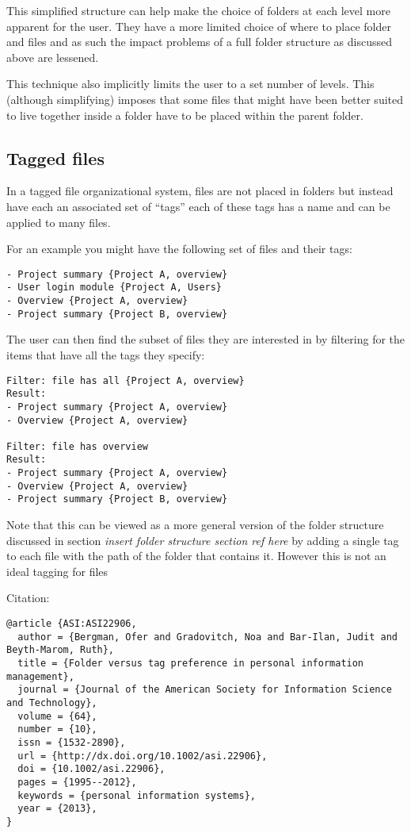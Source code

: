 This simplified structure can help make the choice of folders at each
level more apparent for the user. They have a more limited choice of
where to place folder and files and as such the impact problems of a
full folder structure as discussed above are lessened.

This technique also implicitly limits the user to a set number of
levels. This (although simplifying) imposes that some files that might
have been better suited to live together inside a folder have to be
placed within the parent folder.

\subsection{Tagged files}\label{tagged-files}

In a tagged file organizational system, files are not placed in folders
but instead have each an associated set of ``tags'' each of these tags
has a name and can be applied to many files.

For an example you might have the following set of files and their tags:

\begin{verbatim}
- Project summary {Project A, overview}
- User login module {Project A, Users}
- Overview {Project A, overview}
- Project summary {Project B, overview}
\end{verbatim}

The user can then find the subset of files they are interested in by
filtering for the items that have all the tags they specify:

\begin{verbatim}
Filter: file has all {Project A, overview}
Result:
- Project summary {Project A, overview}
- Overview {Project A, overview}

Filter: file has overview
Result:
- Project summary {Project A, overview}
- Overview {Project A, overview}
- Project summary {Project B, overview}
\end{verbatim}

Note that this can be viewed as a more general version of the folder
structure discussed in section \emph{insert folder structure section ref
here} by adding a single tag to each file with the path of the folder
that contains it. However this is not an ideal tagging for files

Citation:

\begin{verbatim}
@article {ASI:ASI22906,
  author = {Bergman, Ofer and Gradovitch, Noa and Bar-Ilan, Judit and Beyth-Marom, Ruth},
  title = {Folder versus tag preference in personal information management},
  journal = {Journal of the American Society for Information Science and Technology},
  volume = {64},
  number = {10},
  issn = {1532-2890},
  url = {http://dx.doi.org/10.1002/asi.22906},
  doi = {10.1002/asi.22906},
  pages = {1995--2012},
  keywords = {personal information systems},
  year = {2013},
}
\end{verbatim}

